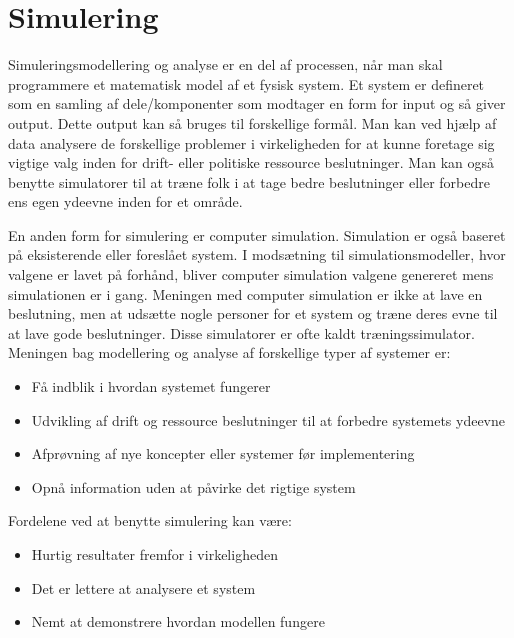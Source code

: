 \chapter{Simulering}\label{Simulering}

Simuleringsmodellering og analyse er en del af processen, når man skal programmere et matematisk model af et fysisk system. Et system er defineret som en samling af dele/komponenter som modtager en form for input og så giver output. Dette output kan så bruges til forskellige formål. Man kan ved hjælp af data analysere de forskellige problemer i virkeligheden for at kunne foretage sig vigtige valg inden for drift- eller politiske ressource beslutninger. Man kan også benytte simulatorer til at træne folk i at tage bedre beslutninger eller forbedre ens egen ydeevne inden for et område. \cite[s. 16-20]{SimulationHandbook}

\vspace{5mm}

En anden form for simulering er computer simulation. Simulation er også baseret på eksisterende eller foreslået system. I modsætning til simulationsmodeller, hvor valgene er lavet på forhånd, bliver computer simulation valgene genereret mens simulationen er i gang. Meningen med computer simulation er ikke at lave en beslutning, men at udsætte nogle personer for et system og træne deres evne til at lave gode beslutninger. Disse simulatorer er ofte kaldt træningssimulator. Meningen bag modellering og analyse af forskellige typer af systemer er:

\begin{itemize}
\item Få indblik i hvordan systemet fungerer
\item Udvikling af drift og ressource beslutninger til at forbedre systemets ydeevne
\item Afprøvning af nye koncepter eller systemer før implementering
\item Opnå information uden at påvirke det rigtige system
\end{itemize}

\vspace{5mm}

Fordelene ved at benytte simulering kan være:
\begin{itemize}
\item Hurtig resultater fremfor i virkeligheden
\item Det er lettere at analysere et system
\item Nemt at demonstrere hvordan modellen fungere
\end{itemize}

